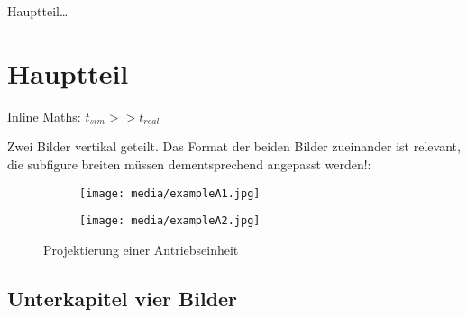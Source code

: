 
Hauptteil\ldots

\section{Hauptteil}
Inline Maths: $t_{sim} >> t_{real}$

Zwei Bilder vertikal geteilt. Das Format der beiden Bilder zueinander ist relevant, die subfigure breiten
müssen dementsprechend angepasst werden!:
\begin{figure}[H]
  \centering

  \hfill
  \begin{subfigure}[t]{0.65\textwidth}
    \texttt{[image: media/exampleA1.jpg]}
  \end{subfigure}
  \hfill
  \begin{subfigure}[t]{0.3\textwidth}
    \texttt{[image: media/exampleA2.jpg]}
  \end{subfigure}
  \hfill

  \captionsetup{width=0.8\textwidth}
  \caption[Projektierung]{Projektierung einer Antriebseinheit}

  \label{antrieb1}
\end{figure}

\newpage

\subsection{Unterkapitel vier Bilder}

